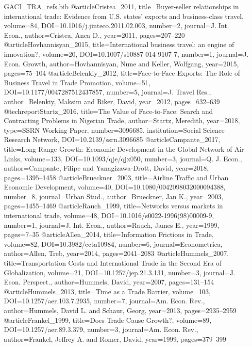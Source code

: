 \begin{filecontents*}[overwrite]{GACI_TRA_refs.bib}
@article{Cristea_2011, title={Buyer-seller relationships in international trade: Evidence from {U.S.} states' exports and business-class travel}, volume={84}, DOI={10.1016/j.jinteco.2011.02.003}, number={2}, journal={J. Int. Econ.}, author={Cristea, Anca D.}, year={2011}, pages={207--220} }
@article{Hovhannisyan_2015, title={International business travel: an engine of innovation?}, volume={20}, DOI={10.1007/s10887-014-9107-7}, number={1}, journal={J. Econ. Growth}, author={Hovhannisyan, Nune and Keller, Wolfgang}, year={2015}, pages={75--104} }
@article{Belenkiy_2012, title={Face-to-Face Exports: The Role of Business Travel in Trade Promotion}, volume={51}, DOI={10.1177/0047287512437857}, number={5}, journal={J. Travel Res.}, author={Belenkiy, Maksim and Riker, David}, year={2012}, pages={632--639} }
@techreport{Startz_2016, title={The Value of Face-to-Face: Search and Contracting Problems in {Nigerian} Trade}, author={Startz, Meredith}, year={2018}, type={SSRN Working Paper}, number={3096685}, institution={Social Science Research Network}, DOI={10.2139/ssrn.3096685} }
@article{Campante_2017, title={Long-Range Growth: Economic Development in the Global Network of Air Links}, volume={133}, DOI={10.1093/qje/qjx050}, number={3}, journal={Q. J. Econ.}, author={Campante, Filipe and Yanagizawa-Drott, David}, year={2018}, pages={1395--1458} }
@article{Brueckner_2003, title={Airline Traffic and Urban Economic Development}, volume={40}, DOI={10.1080/0042098032000094388}, number={8}, journal={Urban Stud.}, author={Brueckner, Jan K.}, year={2003}, pages={1455--1469} }
@article{Rauch_1999, title={Networks versus markets in international trade}, volume={48}, DOI={10.1016/s0022-1996(98)00009-9}, number={1}, journal={J. Int. Econ.}, author={Rauch, James E.}, year={1999}, pages={7--35} }
@article{Allen_2014, title={Information Frictions in Trade}, volume={82}, DOI={10.3982/ecta10984}, number={6}, journal={Econometrica}, author={Allen, Treb}, year={2014}, pages={2041--2083} }
@article{Hummels_2007, title={Transportation Costs and International Trade in the Second Era of Globalization}, volume={21}, DOI={10.1257/jep.21.3.131}, number={3}, journal={J. Econ. Perspect.}, author={Hummels, David}, year={2007}, pages={131--154} }
@article{Hummels_2013, title={Time as a Trade Barrier}, volume={103}, DOI={10.1257/aer.103.7.2935}, number={7}, journal={Am. Econ. Rev.}, author={Hummels, David L. and Schaur, Georg}, year={2013}, pages={2935--2959} }
@article{Frankel_1999, title={Does Trade Cause Growth?}, volume={89}, DOI={10.1257/aer.89.3.379}, number={3}, journal={Am. Econ. Rev.}, author={Frankel, Jeffrey A. and Romer, David}, year={1999}, pages={379--399} }

\end{filecontents*}
